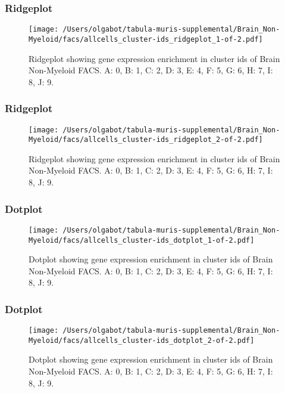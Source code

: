 \clearpage
\clearpage
\subsubsection{Ridgeplot}
\begin{figure}[h]
\centering
\texttt{[image: /Users/olgabot/tabula-muris-supplemental/Brain\_Non-Myeloid/facs/allcells\_cluster-ids\_ridgeplot\_1-of-2.pdf]}

\caption{ Ridgeplot  showing gene expression enrichment in cluster ids of Brain Non-Myeloid FACS. A: 0, B: 1, C: 2, D: 3, E: 4, F: 5, G: 6, H: 7, I: 8, J: 9.}
\end{figure}


\clearpage
\clearpage
\subsubsection{Ridgeplot}
\begin{figure}[h]
\centering
\texttt{[image: /Users/olgabot/tabula-muris-supplemental/Brain\_Non-Myeloid/facs/allcells\_cluster-ids\_ridgeplot\_2-of-2.pdf]}

\caption{ Ridgeplot  showing gene expression enrichment in cluster ids of Brain Non-Myeloid FACS. A: 0, B: 1, C: 2, D: 3, E: 4, F: 5, G: 6, H: 7, I: 8, J: 9.}
\end{figure}


\clearpage
\clearpage
\subsubsection{Dotplot}
\begin{figure}[h]
\centering
\texttt{[image: /Users/olgabot/tabula-muris-supplemental/Brain\_Non-Myeloid/facs/allcells\_cluster-ids\_dotplot\_1-of-2.pdf]}

\caption{ Dotplot  showing gene expression enrichment in cluster ids of Brain Non-Myeloid FACS. A: 0, B: 1, C: 2, D: 3, E: 4, F: 5, G: 6, H: 7, I: 8, J: 9.}
\end{figure}


\clearpage
\clearpage
\subsubsection{Dotplot}
\begin{figure}[h]
\centering
\texttt{[image: /Users/olgabot/tabula-muris-supplemental/Brain\_Non-Myeloid/facs/allcells\_cluster-ids\_dotplot\_2-of-2.pdf]}

\caption{ Dotplot  showing gene expression enrichment in cluster ids of Brain Non-Myeloid FACS. A: 0, B: 1, C: 2, D: 3, E: 4, F: 5, G: 6, H: 7, I: 8, J: 9.}
\end{figure}


